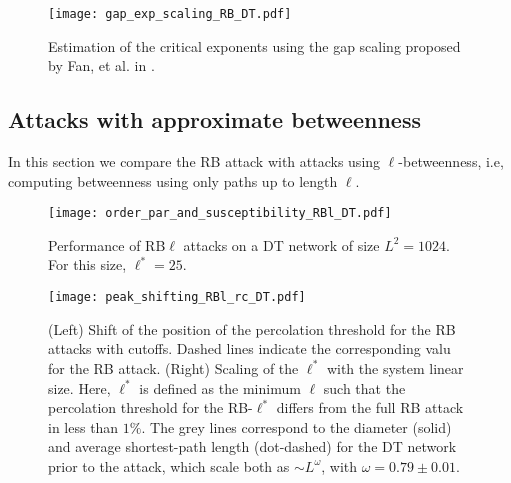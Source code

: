 \documentclass{article}
\begin{document}
\begin{figure}
\centering
\texttt{[image: gap\_exp\_scaling\_RB\_DT.pdf]}
\caption{\label{fig:gap_exp} Estimation of the critical exponents using the gap scaling proposed by Fan, et al. in \cite{Fan2020}.}
\end{figure}


\subsection{Attacks with approximate betweenness}

In this section we compare the RB attack with attacks using $\ell$-betweenness, i.e, computing betweenness using only paths up to length $\ell$. 


\begin{figure}
\centering
\texttt{[image: order\_par\_and\_susceptibility\_RBl\_DT.pdf]}
\caption{\label{fig:RBl_attacks} Performance of RB$\ell$ attacks on a DT network of size $L^2=1024$. For this size, $\ell^*=25$.}
\end{figure}


\begin{figure}
\centering
\texttt{[image: peak\_shifting\_RBl\_rc\_DT.pdf]}
\caption{\label{fig:rc_per_cutoff} (Left) Shift of the position of the percolation threshold for the RB attacks with cutoffs. Dashed lines indicate the corresponding valu for the RB attack. (Right) Scaling of the $\ell^*$ with the system linear size. Here, $\ell^*$ is defined as the minimum $\ell$ such that the percolation threshold  for the RB-$\ell^*$ differs from the full RB attack in less than $1\%$. The grey lines correspond to the diameter (solid) and average shortest-path length (dot-dashed) for the DT network prior to the attack, which scale both as $\sim L^{\omega}$, with $\omega = 0.79\pm 0.01$.}
\end{figure}





\end{document}
